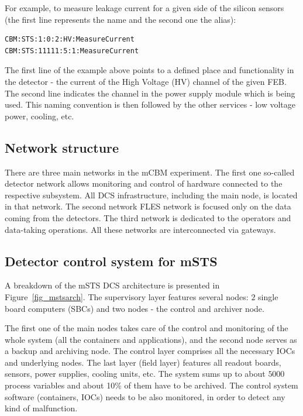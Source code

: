 For example, to measure leakage current for a given side of the silicon sensors  (the first line represents the name and the second one the alias):
\begin{verbatim}
CBM:STS:1:0:2:HV:MeasureCurrent
CBM:STS:11111:5:1:MeasureCurrent
\end{verbatim}
The first line of the example above points to a defined place and functionality in the detector - the current of the High Voltage (\gls{HV}) channel of the given \gls{FEB}. The second line indicates the channel in the power supply module which is being used. This naming convention is then followed by the other services - low voltage power, cooling, etc.  
\subsection{Network structure}
There are three main networks in the mCBM experiment. The first one so-called detector network allows monitoring and control of hardware connected to the respective subsystem. All \gls{DCS} infrastructure, including the main node, is located in that network. The second network FLES network is focused only on the data coming from the detectors. The third network is dedicated to the operators and data-taking operations. All these networks are interconnected via gateways.  

\subsection{Detector control system for mSTS}
A breakdown of the \gls{mSTS} \gls{DCS} architecture is presented in Figure~\ref{fig_mstsarch}. The supervisory layer features several nodes: $2$ single board computers (\glspl{SBC}) and two nodes - the control and archiver node. 

The first one of the main nodes takes care of the control and monitoring of the whole system (all the containers and applications), and the second node serves as a backup and archiving node. The control layer comprises all the necessary \glspl{IOC} and underlying nodes. The last layer (field layer) features all readout boards, sensors, power supplies, cooling units, etc. The system sums up to about $5000$ process variables and about 10\% of them have to be archived. The control system software (containers, \glspl{IOC}) needs to be also monitored, in order to detect any kind of malfunction. 

